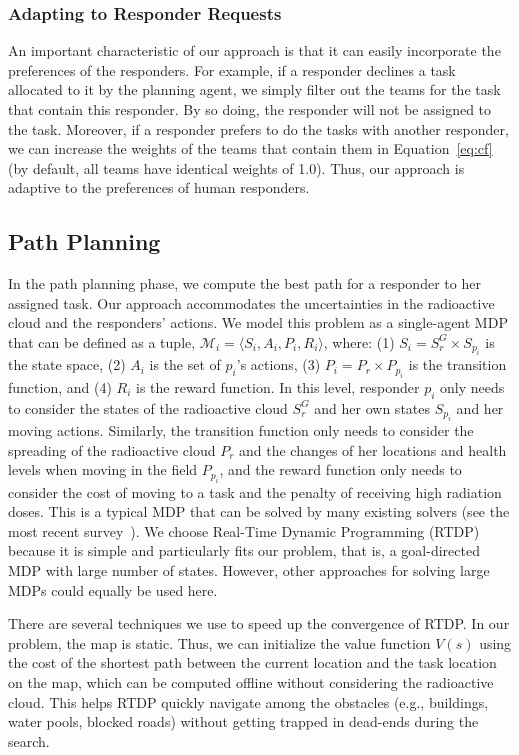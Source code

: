 \subsubsection{Adapting to Responder Requests}\label{sec:adaptive}
\noindent An important characteristic of our approach is that it can easily
incorporate the preferences of the responders. For example, if a
responder declines a task allocated to it by the planning agent, we
simply filter out the teams for the task that contain this
responder. By so doing, the responder will not be assigned to the
task. Moreover, if a responder prefers to do the tasks with another
responder, we can increase the weights of the teams that
contain them in Equation~\ref{eq:cf} (by default, all teams
have identical weights of 1.0). Thus, our approach is adaptive to the
 preferences of human responders.

\subsection{Path Planning}
\label{sec:pathplanning}

\noindent In the path planning phase, we compute the best path for a
responder to her assigned task.  Our approach accommodates the
uncertainties in the radioactive cloud and the responders' actions. We
model this problem as a single-agent MDP that can be defined as a
tuple, $\mathcal{M}_i = \langle S_i, A_i, P_i, R_i \rangle$, where:
(1) $S_i = S^G_r \times S_{p_i}$ is the state space, (2) $A_i$ is the
set of $p_i$'s actions, (3) $P_i = P_r \times P_{p_i}$ is the
transition function, and (4) $R_i$ is the reward function. In this
level, responder $p_i$ only needs to consider the states of the
radioactive cloud $S^G_r$ and her own states $S_{p_i}$ and her moving
actions. Similarly, the transition function only needs to consider the
spreading of the radioactive cloud $P_r$ and the changes of her
locations and health levels when moving in the field $P_{p_i}$, and
the reward function only needs to consider the cost of moving to a
task and the penalty of receiving high radiation doses. This is a
typical MDP that can be solved by many existing solvers (see the most
recent survey~\cite{kolobov2012planning}). We choose Real-Time Dynamic
Programming (RTDP)~\cite{barto1995learning} because it is simple and
particularly fits our problem, that is, a goal-directed MDP with large
number of states. However, other approaches for solving large MDPs
could equally be used here.

There are several techniques we use to speed up the convergence of
RTDP. In our problem, the map is static. Thus, we can initialize
the value function $V(s)$ using the cost of the shortest path
between the current location and the task location on the map, which
can be computed offline without considering the radioactive cloud.
This helps RTDP quickly navigate among the obstacles (e.g.,
buildings, water pools, blocked roads) without getting trapped in
dead-ends during the search. 

